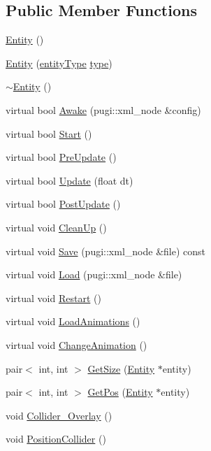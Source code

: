 \subsection*{Public Member Functions}
\begin{DoxyCompactItemize}
\item 
\mbox{\hyperlink{class_entity_a980f368aa07ce358583982821533a54a}{Entity}} ()
\item 
\mbox{\hyperlink{class_entity_a87f2cfed74d4760a135942131d368dea}{Entity}} (\mbox{\hyperlink{class_entity_afd4a8ca3ac152f193c21d6a5100f1192}{entity\+Type}} \mbox{\hyperlink{class_entity_a70da6c268b2cc0b615095dcb762a51d0}{type}})
\item 
\mbox{\hyperlink{class_entity_adf6d3f7cb1b2ba029b6b048a395cc8ae}{$\sim$\+Entity}} ()
\item 
virtual bool \mbox{\hyperlink{class_entity_a4ee31889b59ec66b53c32639346969cb}{Awake}} (pugi\+::xml\+\_\+node \&config)
\item 
virtual bool \mbox{\hyperlink{class_entity_aca7ceaadbeb569c3a981087018193104}{Start}} ()
\item 
virtual bool \mbox{\hyperlink{class_entity_aa7c03939afe436c1d8e13a2b377019e7}{Pre\+Update}} ()
\item 
virtual bool \mbox{\hyperlink{class_entity_ae94191bd0a39541bc222f201d799e1c8}{Update}} (float dt)
\item 
virtual bool \mbox{\hyperlink{class_entity_a2a011149934758929cdbf5db65877c76}{Post\+Update}} ()
\item 
virtual void \mbox{\hyperlink{class_entity_af018d340c1d6d20e27fe2bb55d7c7260}{Clean\+Up}} ()
\item 
virtual void \mbox{\hyperlink{class_entity_a53b1ed004bde1e251ff63d12fa102f06}{Save}} (pugi\+::xml\+\_\+node \&file) const
\item 
virtual void \mbox{\hyperlink{class_entity_ad13f6b86a79f8661862587d9b81d54a2}{Load}} (pugi\+::xml\+\_\+node \&file)
\item 
virtual void \mbox{\hyperlink{class_entity_a05ca1cde5003aa7d9f4c35ea03e0d55b}{Restart}} ()
\item 
virtual void \mbox{\hyperlink{class_entity_a4d0f9b582d81ccfdb739796f3d4cca0d}{Load\+Animations}} ()
\item 
virtual void \mbox{\hyperlink{class_entity_a54f27cfe16de1a39fb77bda1368fa40e}{Change\+Animation}} ()
\item 
pair$<$ int, int $>$ \mbox{\hyperlink{class_entity_aa74de5c59a3aafcb65c1388838929f03}{Get\+Size}} (\mbox{\hyperlink{class_entity}{Entity}} $\ast$entity)
\item 
pair$<$ int, int $>$ \mbox{\hyperlink{class_entity_a6fefca09c3b16691e9a92445f4f9e203}{Get\+Pos}} (\mbox{\hyperlink{class_entity}{Entity}} $\ast$entity)
\item 
void \mbox{\hyperlink{class_entity_a7cf26e6c6c826afb27a9c6e37cf360e8}{Collider\+\_\+\+Overlay}} ()
\item 
void \mbox{\hyperlink{class_entity_a1c2ad92b93d43d021e68421521b80a4c}{Position\+Collider}} ()
\end{DoxyCompactItemize}
